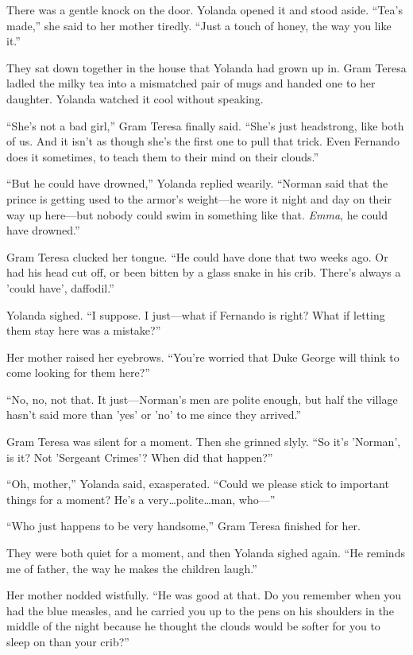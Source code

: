 \documentclass[10pt]{book}
\begin{document}
There was a gentle knock on the door. Yolanda opened it and stood aside. ``Tea's made,'' she said to her mother tiredly. ``Just a touch of honey, the way you like it.''

They sat down together in the house that Yolanda had grown up in. Gram Teresa ladled the milky tea into a mismatched pair of mugs and handed one to her daughter. Yolanda watched it cool without speaking.

``She's not a bad girl,'' Gram Teresa finally said. ``She's just headstrong, like both of us. And it isn't as though she's the first one to pull that trick. Even Fernando does it sometimes, to teach them to their mind on their clouds.''

``But he could have drowned,'' Yolanda replied wearily. ``Norman said that the prince is getting used to the armor's weight---he wore it night and day on their way up here---but nobody could swim in something like that. \emph{Emma}, he could have drowned.''

Gram Teresa clucked her tongue. ``He could have done that two weeks ago. Or had his head cut off, or been bitten by a glass snake in his crib. There's always a 'could have', daffodil.''

Yolanda sighed. ``I suppose. I just---what if Fernando is right? What if letting them stay here was a mistake?''

Her mother raised her eyebrows. ``You're worried that Duke George will think to come looking for them here?''

``No, no, not that. It just---Norman's men are polite enough, but half the village hasn't said more than 'yes' or 'no' to me since they arrived.''

Gram Teresa was silent for a moment. Then she grinned slyly. ``So it's 'Norman', is it? Not 'Sergeant Crimes'? When did that happen?''

``Oh, mother,'' Yolanda said, exasperated. ``Could we please stick to important things for a moment? He's a very{\ldots}polite{\ldots}man, who---''

``Who just happens to be very handsome,'' Gram Teresa finished for her.

They were both quiet for a moment, and then Yolanda sighed again. ``He reminds me of father, the way he makes the children laugh.''

Her mother nodded wistfully. ``He was good at that. Do you remember when you had the blue measles, and he carried you up to the pens on his shoulders in the middle of the night because he thought the clouds would be softer for you to sleep on than your crib?''
\end{document}
